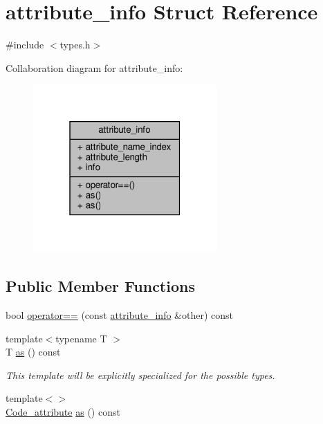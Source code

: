 \hypertarget{structattribute__info}{}\section{attribute\+\_\+info Struct Reference}
\label{structattribute__info}


{\ttfamily \#include $<$types.\+h$>$}



Collaboration diagram for attribute\+\_\+info\+:\nopagebreak
\begin{figure}[H]
\begin{center}
\leavevmode
\includegraphics[width=199pt]{structattribute__info__coll__graph}
\end{center}
\end{figure}
\subsection*{Public Member Functions}
\begin{DoxyCompactItemize}
\item 
bool \hyperlink{structattribute__info_a3cfff4cc60bf28912fafbe8860f76598}{operator==} (const \hyperlink{structattribute__info}{attribute\+\_\+info} \&other) const
\item 
{\footnotesize template$<$typename T $>$ }\\T \hyperlink{structattribute__info_ace33b133435450d7d161751a3393de11}{as} () const
\begin{DoxyCompactList}\small\item\em This template will be explicitly specialized for the possible types. \end{DoxyCompactList}\item 
{\footnotesize template$<$$>$ }\\\hyperlink{structCode__attribute}{Code\+\_\+attribute} \hyperlink{structattribute__info_a22251f0b4f95aabf0fc722ca80651d88}{as} () const
\end{DoxyCompactItemize}
